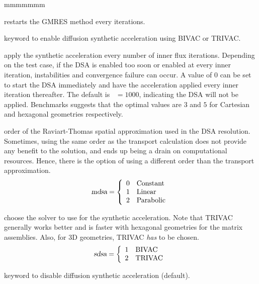 \begin{ListeDeDescription}{mmmmmmm}
\item[\dusa{nstart}] restarts the GMRES method every  iterations.

\item[\moc{DSA}] keyword to enable diffusion synthetic acceleration using BIVAC or TRIVAC.
\item[\dusa{ndsa}] apply the synthetic acceleration every  number of inner flux iterations. Depending on the test case, if the DSA is enabled too soon or enabled at every inner iteration, instabilities and convergence failure can occur. A value of $0$ can be set to start the DSA immediately and have the acceleration applied every inner iteration thereafter. The default is ~$=1000$, indicating the DSA will not be applied. Benchmarks suggests that the optimal values are $3$ and $5$ for Cartesian and hexagonal geometries respectively.
\item[\dusa{mdsa}] order of the Raviart-Thomas spatial approximation used in the DSA resolution. Sometimes, using the same order as the transport calculation does not provide any benefit to the solution, and ends up being a drain on computational resources. Hence, there is the option of using a different order than the transport approximation.
\begin{displaymath}
\dusa{mdsa} = \left\{
\begin{array}{rl}
 0 & \textrm{Constant} \\
 1 & \textrm{Linear} \\
 2 & \textrm{Parabolic} \\
\end{array} \right.
\end{displaymath}
\item[\dusa{sdsa}] choose the solver to use for the synthetic acceleration. Note that TRIVAC generally works better and is faster with hexagonal geometries for the matrix assemblies. Also, for 3D geometries, TRIVAC \emph{has} to be chosen.
\begin{displaymath}
\dusa{sdsa} = \left\{
\begin{array}{rl}
 1 & \textrm{BIVAC} \\
 2 & \textrm{TRIVAC} \\
\end{array} \right.
\end{displaymath}

\item[\moc{NDSA}] keyword to disable diffusion synthetic acceleration (default).


\end{ListeDeDescription}
